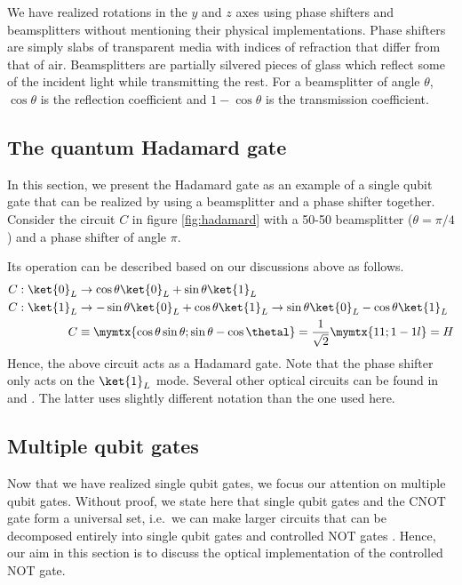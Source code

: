 We have realized rotations in the $y$ and $z$ axes using phase shifters and beamsplitters without mentioning their physical implementations. Phase shifters are simply slabs of transparent media with indices of refraction that differ from that of air. Beamsplitters are partially silvered pieces of glass which reflect some of the incident light while transmitting the rest. For a beamsplitter of angle $\theta$, $\cos\theta$ is the reflection coefficient and $1-\cos\theta$ is the transmission coefficient.

\subsection{The quantum Hadamard gate\label{sec:hadamard}}
In this section, we present the Hadamard gate as an example of a single qubit gate that can be realized by using a beamsplitter and a phase shifter together. Consider the circuit $C$ in figure \ref{fig:hadamard} with a 50-50 beamsplitter ($\theta = \pi/4$) and a phase shifter of angle $\pi$.


Its operation can be described based on our discussions above as follows.
\begin{align}
C:\ket{0}_L &\rightarrow \cos\theta\ket{0}_L + \sin\theta\ket{1}_L\\
C:\ket{1}_L &\rightarrow -\sin\theta\ket{0}_L + \cos\theta\ket{1}_L \rightarrow \sin\theta\ket{0}_L - \cos\theta\ket{1}_L\\
C&\equiv \mymtx{\cos\theta \sin\theta;\sin\theta -\cos\thetal} = \frac{1}{\sqrt{2}}\mymtx{1 1;1 -1l} = H
\end{align}
Hence, the above circuit acts as a Hadamard gate. Note that the phase shifter only acts on the $\ket{1}_L$ mode. Several other optical circuits can be found in \cite{nielsen2000} and \cite{klm}. The latter uses slightly different notation than the one used here.

\subsection{Multiple qubit gates}
Now that we have realized single qubit gates, we focus our attention on multiple qubit gates. Without proof, we state here that single qubit gates and the CNOT gate form a universal set, i.e.\ we can make larger circuits that can be decomposed entirely into single qubit gates and controlled NOT gates \cite{klm}. Hence, our aim in this section is to discuss the optical implementation of the controlled NOT gate.

